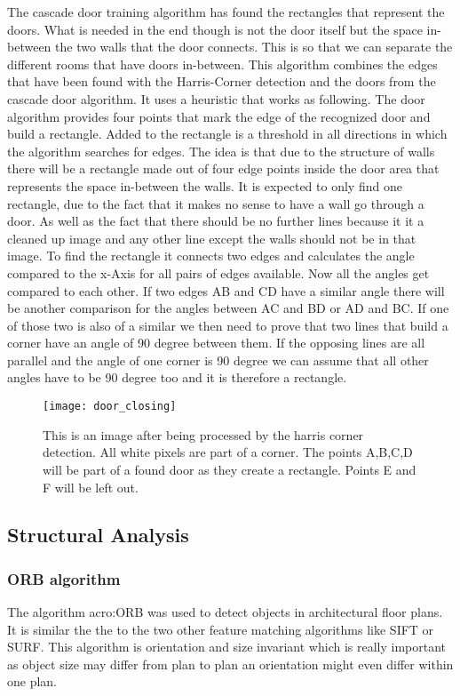 The cascade door training algorithm has found the rectangles that represent the doors. What is needed in the end though is not the door itself but the space in-between the two walls that the door connects. This is so that we can separate the different rooms that have doors in-between.
This algorithm combines the edges that have been found with the Harris-Corner detection and the doors from the cascade door algorithm. It uses a heuristic that works as following. The door algorithm provides four points that mark the edge of the recognized door and build a rectangle.
Added to the rectangle is  a threshold in all directions in which the algorithm searches for edges. The idea is that due to the structure of walls there will be a rectangle made out of four edge points inside the door area that represents the space in-between the walls. It is expected to only find one rectangle, due to the fact that it makes no sense to have a wall go through a door. As well as the fact that there should be no further lines because it it a cleaned up image and any other line except the walls should not be in that image.
To find the rectangle it connects two edges and calculates the angle compared to the x-Axis for all pairs of edges available. Now all the angles get compared to each other. If two edges AB and CD have a similar angle there will be another comparison for the angles between AC and BD or AD and BC. If one of those two is also of a similar we then need to prove that two lines that build a corner have an angle of 90 degree between them. If the opposing lines are all parallel and the angle of one corner is 90 degree we can assume that all other angles have to be 90 degree too and it is therefore a rectangle. 

\begin{figure}[h]
	\centering
	\texttt{[image: door\_closing]}
	\caption{This is an image after being processed by the harris corner detection. All white pixels are part of a corner. The points A,B,C,D will be part of a found door as they create a rectangle. Points E and F will be left out.}
	\label{fig:door_closing}
\end{figure}


\subsection{Structural Analysis}

\subsubsection{ORB algorithm}
\label{sub:ORBAlgorithm}
The algorithm \acrfull{acro:ORB} was used to detect objects in architectural floor plans. It is similar the the to the two other feature matching algorithms like SIFT or SURF. This algorithm is orientation and size invariant which is really important as object size may differ from plan to plan an orientation might even differ within one plan.

